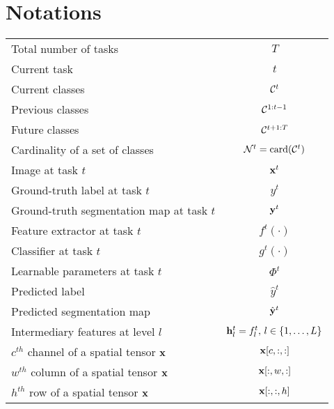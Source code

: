\chapter{Notations}\label{chap:notations}

\begin{table}[H]
    \centering
    \begin{tabular}{@{}l@{\hspace{5cm}}c@{}}
        Total number of tasks                      & $T$                                       \\
        Current task                               & $t$                                       \\
        Current classes                            & $\mathcal{C}^t$                                  \\
        Previous classes                           & $\mathcal{C}^{1:t-1}$                            \\
        Future classes                             & $\mathcal{C}^{t+1:T}$                            \\
        Cardinality of a set of classes            & $\mathcal{N}^t=\operatorname{card}(\mathcal{C}^{t})$    \\
        Image at task $t$                          & $\mathbf{x}^t$                                   \\
        Ground-truth label at task $t$             & $y^t$                                     \\
        Ground-truth segmentation map at task $t$  & $\mathbf{y}^t$                                   \\
        Feature extractor at task $t$              & $f^t(\cdot)$                              \\
        Classifier at task $t$                     & $g^t(\cdot)$                              \\
        Learnable parameters at task $t$           & $\Phi^t$                                  \\
        Predicted label                            & $\hat{y}^t$                               \\
        Predicted segmentation map                 & $\hat{\mathbf{y}}^t$                             \\
        Intermediary features at level $l$         & $\mathbf{h}^t_l = f^t_l,\,l \in \{1, \dots, L\}$ \\
        $c^{th}$ channel of a spatial tensor $\mathbf{x}$ & $\mathbf{x}[c,:,:]$                              \\
        $w^{th}$ column of a spatial tensor $\mathbf{x}$  & $\mathbf{x}[:,w,:]$                              \\
        $h^{th}$ row of a spatial tensor $\mathbf{x}$     & $\mathbf{x}[:,:,h]$                              \\
    \end{tabular}
    \label{tab:notation_classif}
\end{table}
